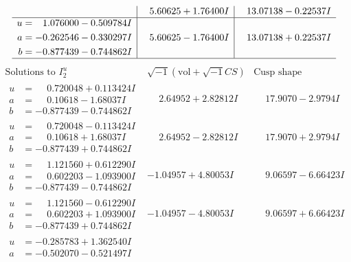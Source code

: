 \documentclass[1p]{elsarticle_modified}
\theoremstyle{definition}
\newcommand{\I}{\sqrt{-1}}
\begin{document}
$$\begin{array}{c|c|c}
 & \phantom{-}5.60625 + 1.76400 I & \phantom{-}13.07138 - 0.22537 I \\ \hline\begin{aligned}
u &= \phantom{-}1.076000 - 0.509784 I \\
a &= -0.262546 - 0.330297 I \\
b &= -0.877439 - 0.744862 I\end{aligned}
 & \phantom{-}5.60625 - 1.76400 I & \phantom{-}13.07138 + 0.22537 I\\
 \hline 
 \end{array}$$\newpage$$\begin{array}{c|c|c}  
\text{Solutions to }I^u_{2}& \I (\text{vol} + \sqrt{-1}CS) & \text{Cusp shape}\\
 \hline 
\begin{aligned}
u &= \phantom{-}0.720048 + 0.113424 I \\
a &= \phantom{-}0.10618 - 1.68037 I \\
b &= -0.877439 - 0.744862 I\end{aligned}
 & \phantom{-}2.64952 + 2.82812 I & \phantom{-}17.9070 - 2.9794 I \\ \hline\begin{aligned}
u &= \phantom{-}0.720048 - 0.113424 I \\
a &= \phantom{-}0.10618 + 1.68037 I \\
b &= -0.877439 + 0.744862 I\end{aligned}
 & \phantom{-}2.64952 - 2.82812 I & \phantom{-}17.9070 + 2.9794 I \\ \hline\begin{aligned}
u &= \phantom{-}1.121560 + 0.612290 I \\
a &= \phantom{-}0.602203 - 1.093900 I \\
b &= -0.877439 - 0.744862 I\end{aligned}
 & -1.04957 + 4.80053 I & \phantom{-}9.06597 - 6.66423 I \\ \hline\begin{aligned}
u &= \phantom{-}1.121560 - 0.612290 I \\
a &= \phantom{-}0.602203 + 1.093900 I \\
b &= -0.877439 + 0.744862 I\end{aligned}
 & -1.04957 - 4.80053 I & \phantom{-}9.06597 + 6.66423 I \\ \hline\begin{aligned}
u &= -0.285783 + 1.362540 I \\
a &= -0.502070 - 0.521497 I \\

\end{aligned}
\end{array}$$
\end{document}
